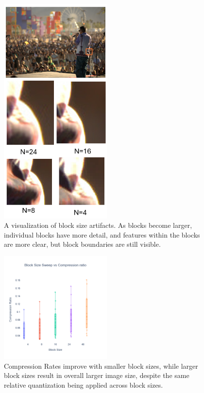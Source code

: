 \begin{figure}
    \includegraphics[width=0.5\textwidth]{assets/Block Quantization Artifacts.png}
    \caption{A visualization of block size artifacts. As blocks become larger, individual blocks have more detail, and features within the blocks are more clear, but block boundaries are still visible.}
    \label{fig:block_quantization_artifacts}
\end{figure}

\begin{figure}
    \includegraphics[width=0.5\textwidth]{assets/Comp Rate VS block Size.png}
    \caption{Compression Rates improve with smaller block sizes, while larger block sizes result in overall larger image size, despite the same relative quantization being applied across block sizes.}
    \label{fig:block_comp_rates}
\end{figure}

